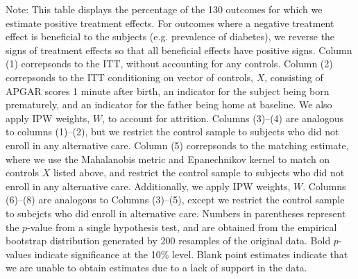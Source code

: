 \begin{table}[H]
\begin{threeparttable}
\begin{tabular}{cccccccccc}
  \hline\hline
  \end{tabular}
    \begin{tablenotes}
    \scriptsize
    \item 
Note: This table displays the percentage of the 130 outcomes for which we estimate positive
treatment effects. For outcomes where a negative treatment effect is beneficial to the subjects
(e.g. prevalence of diabetes), we reverse the signs of treatment effects so that all beneficial 
effects have positive signs.
Column (1) correpsonds to the ITT, without accounting for any controls.
Column (2) correpsonds to the ITT conditioning on vector of controls, $X$, consisting of APGAR scores 1 
minute after birth, an indicator for the subject being born prematurely, and an indicator for the 
father being home at baseline. We also apply IPW weights, $W$, to account for attrition.
Columns (3)--(4) are analogous to columns (1)--(2), but we restrict the control sample to subjects
who did not enroll in any alternative care.
Column (5) correpsonds to the matching estimate, where we use the Mahalanobis metric and Epanechnikov kernel
to match on controls $X$ listed above, and restrict the control sample to subjects who did not enroll
in any alternative care. Additionally, we apply IPW weights, $W$.
Columns (6)--(8) are analogous to Columns (3)--(5), except we restrict the control sample to subejcts
who did enroll in alternative care.
Numbers in parentheses represent the $p$-value from a single hypothesis test, and are obtained from 
the empirical bootstrap distribution generated by 200 resamples of the original data. 
Bold $p$-values indicate significance at the 10\% level. Blank point estimates indicate that
we are unable to obtain estimates due to a lack of support in the data. 

    \end{tablenotes}
  \end{threeparttable}

\end{table}